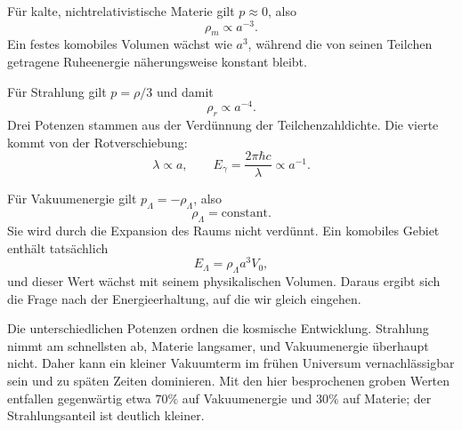 Für kalte, nichtrelativistische Materie gilt \(p\approx0\), also
\begin{equation}
\rho_m\propto a^{-3}.
\end{equation}
Ein festes komobiles Volumen wächst wie \(a^3\), während die von seinen Teilchen getragene Ruheenergie näherungsweise konstant bleibt.

Für Strahlung gilt \(p=\rho/3\) und damit
\begin{equation}
\rho_r\propto a^{-4}.
\end{equation}
Drei Potenzen stammen aus der Verdünnung der Teilchenzahldichte. Die vierte kommt von der Rotverschiebung:
\begin{equation}
\lambda\propto a,
\qquad
E_\gamma=\frac{2\pi\hbar c}{\lambda}\propto a^{-1}.
\end{equation}

\begin{classroomqa}
\end{classroomqa}

Für Vakuumenergie gilt \(p_\Lambda=-\rho_\Lambda\), also
\begin{equation}
\rho_\Lambda=\text{constant}.
\end{equation}
Sie wird durch die Expansion des Raums nicht verdünnt. Ein komobiles Gebiet enthält tatsächlich
\begin{equation}
E_\Lambda=\rho_\Lambda a^3V_0,
\end{equation}
und dieser Wert wächst mit seinem physikalischen Volumen. Daraus ergibt sich die Frage nach der Energieerhaltung, auf die wir gleich eingehen.

Die unterschiedlichen Potenzen ordnen die kosmische Entwicklung. Strahlung nimmt am schnellsten ab, Materie langsamer, und Vakuumenergie überhaupt nicht. Daher kann ein kleiner Vakuumterm im frühen Universum vernachlässigbar sein und zu späten Zeiten dominieren. Mit den hier besprochenen groben Werten entfallen gegenwärtig etwa \(70\%\) auf Vakuumenergie und \(30\%\) auf Materie; der Strahlungsanteil ist deutlich kleiner.

